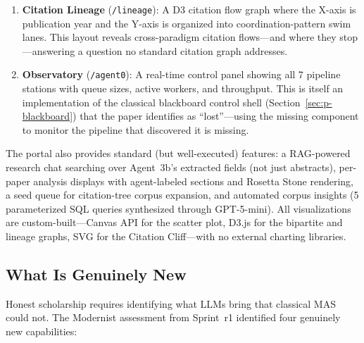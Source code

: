 \documentclass{article}
\begin{document}
\begin{enumerate}[nosep]
  \item \textbf{Citation Lineage} (\texttt{/lineage}): A D3 citation flow graph where
    the X-axis is publication year and the Y-axis is organized into coordination-pattern
    swim lanes. This layout reveals cross-paradigm citation flows---and where they
    stop---answering a question no standard citation graph addresses.

  \item \textbf{Observatory} (\texttt{/agent0}): A real-time control panel showing all
    7 pipeline stations with queue sizes, active workers, and throughput. This is itself
    an implementation of the classical blackboard control shell
    (Section~\ref{sec:p-blackboard}) that the paper identifies as ``lost''---using the
    missing component to monitor the pipeline that discovered it is missing.
\end{enumerate}

\noindent
The portal also provides standard (but well-executed) features: a RAG-powered research
chat searching over Agent~3b's extracted fields (not just abstracts), per-paper analysis
displays with agent-labeled sections and Rosetta Stone rendering, a seed queue for
citation-tree corpus expansion, and automated corpus insights (5 parameterized SQL
queries synthesized through GPT-5-mini). All visualizations are custom-built---Canvas
API for the scatter plot, D3.js for the bipartite and lineage graphs, SVG for the
Citation Cliff---with no external charting libraries.

\subsection{What Is Genuinely New}
\label{sec:res-new}

%
%

Honest scholarship requires identifying what LLMs bring that classical MAS could not.
The Modernist assessment from Sprint~r1 identified four genuinely new capabilities:
\end{document}
